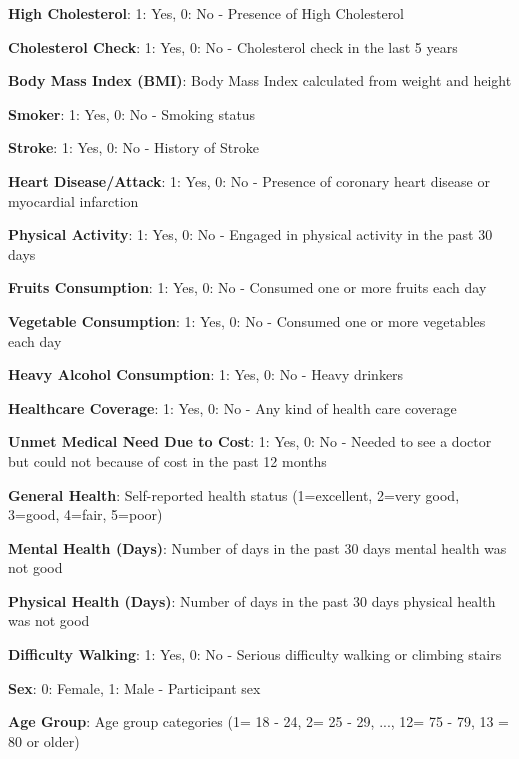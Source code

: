 \documentclass[11pt]{article}
\begin{document}
\begin{codeoutput}
\begin{table}[h]
\begin{threeparttable}
\begin{tablenotes}
\item \textbf{High Cholesterol}: 1: Yes, 0: No - Presence of High Cholesterol
\item \textbf{Cholesterol Check}: 1: Yes, 0: No - Cholesterol check in the last 5 years
\item \textbf{Body Mass Index (BMI)}: Body Mass Index calculated from weight and height
\item \textbf{Smoker}: 1: Yes, 0: No - Smoking status
\item \textbf{Stroke}: 1: Yes, 0: No - History of Stroke
\item \textbf{Heart Disease/Attack}: 1: Yes, 0: No - Presence of coronary heart disease or myocardial infarction
\item \textbf{Physical Activity}: 1: Yes, 0: No - Engaged in physical activity in the past 30 days
\item \textbf{Fruits Consumption}: 1: Yes, 0: No - Consumed one or more fruits each day
\item \textbf{Vegetable Consumption}: 1: Yes, 0: No - Consumed one or more vegetables each day
\item \textbf{Heavy Alcohol Consumption}: 1: Yes, 0: No - Heavy drinkers
\item \textbf{Healthcare Coverage}: 1: Yes, 0: No - Any kind of health care coverage
\item \textbf{Unmet Medical Need Due to Cost}: 1: Yes, 0: No - Needed to see a doctor but could not because of cost in the past 12 months
\item \textbf{General Health}: Self-reported health status (1=excellent, 2=very good, 3=good, 4=fair, 5=poor)
\item \textbf{Mental Health (Days)}: Number of days in the past 30 days mental health was not good
\item \textbf{Physical Health (Days)}: Number of days in the past 30 days physical health was not good
\item \textbf{Difficulty Walking}: 1: Yes, 0: No - Serious difficulty walking or climbing stairs
\item \textbf{Sex}: 0: Female, 1: Male - Participant sex
\item \textbf{Age Group}: Age group categories (1= 18 - 24, 2= 25 - 29, ..., 12= 75 - 79, 13 = 80 or older)
\end{tablenotes}
\end{threeparttable}
\end{table}

\end{codeoutput}
\hypertarget{file-df-interactions-formatted-pkl}{}
\end{document}
